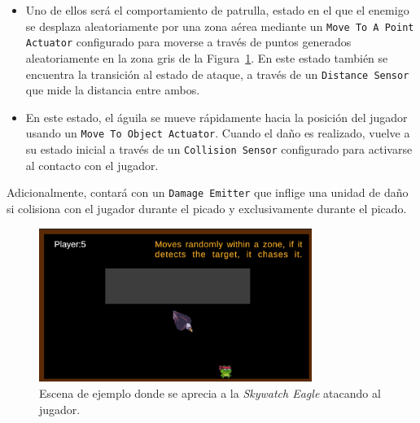 \begin{itemize}
\item Uno de ellos será el comportamiento de patrulla, estado en el que el enemigo se desplaza aleatoriamente por una zona aérea mediante un \texttt{Move To A Point Actuator} configurado para moverse a través de puntos generados aleatoriamente en la zona gris de la  Figura~\ref{fig:SkywatchEagle}. En este estado también se encuentra la transición al estado de ataque, a través de un \texttt{Distance Sensor} que mide la distancia entre ambos. \\
\item En este estado, el águila se mueve rápidamente hacia la posición del jugador usando un \texttt{Move To Object Actuator}. Cuando el daño es realizado, vuelve a su estado inicial a través de un \texttt{Collision Sensor} configurado para activarse al contacto con el jugador.
\end{itemize}

Adicionalmente, contará con un \texttt{Damage Emitter} que inflige una unidad de daño si colisiona con el jugador durante el picado y exclusivamente durante el picado.
\begin{figure}[t]
	\centering
	\includegraphics[height=5cm]{Imagenes/AguilaCayendo.png}
	\caption{Escena de ejemplo donde se aprecia a la \textit{Skywatch Eagle} atacando al jugador.}
	\label{fig:SkywatchEagle}
\end{figure}


